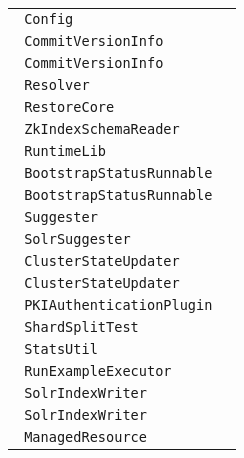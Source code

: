 \begin{center}
\begin{tabular}{ll}
\lstinline/ Config/&\raisebox{0pt}{\lstinline/   parseLuceneVersionString(StringmatchVersion)/}\\ 
\lstinline/ CommitVersionInfo/&\raisebox{0pt}{\lstinline/   fobuild(IndexCommit)/}\\ 
\lstinline/ CommitVersionInfo/&\raisebox{0pt}{\lstinline/   fobuild(IndexCommit)/}\\ 
\lstinline/ Resolver/&\raisebox{0pt}{\lstinline/   resolve(Objecto,JavaBinCodeccodec)/}\\ 
\lstinline/ RestoreCore/&\raisebox{0pt}{\lstinline/   booleandoRestore()/}\\ 
\lstinline/ ZkIndexSchemaReader/&\raisebox{0pt}{\lstinline/   command()/}\\ 
\lstinline/ RuntimeLib/&\raisebox{0pt}{\lstinline/   verify()/}\\ 
\lstinline/ BootstrapStatusRunnable/&\raisebox{0pt}{\lstinline/   sendBootstrapCommand()/}\\ 
\lstinline/ BootstrapStatusRunnable/&\raisebox{0pt}{\lstinline/   sendBootstrapCommand()/}\\ 
\lstinline/ Suggester/&\raisebox{0pt}{\lstinline/   getSuggestions(SpellingOptionsoptions)/}\\ 
\lstinline/ SolrSuggester/&\raisebox{0pt}{\lstinline/   getSuggestions(SuggesterOptionsoptions)/}\\ 
\lstinline/ ClusterStateUpdater/&\raisebox{0pt}{\lstinline/  amILeader()/}\\ 
\lstinline/ ClusterStateUpdater/&\raisebox{0pt}{\lstinline/   amILeader()/}\\ 
\lstinline/ PKIAuthenticationPlugin/&\raisebox{0pt}{\lstinline/   getRemotePublicKey(String)/}\\ 
\lstinline/ ShardSplitTest/&\raisebox{0pt}{\lstinline/   logDebugHelp(int[]))/}\\ 
\lstinline/ StatsUtil/&\raisebox{0pt}{\lstinline/   termFromString(Stringdata)/}\\ 
\lstinline/ RunExampleExecutor/&\raisebox{0pt}{\lstinline/   close()/}\\ 
\lstinline/ SolrIndexWriter/&\raisebox{0pt}{\lstinline/   rollback()/}\\ 
\lstinline/ SolrIndexWriter/&\raisebox{0pt}{\lstinline/   rollback()/}\\ 
\lstinline/ ManagedResource/&\raisebox{0pt}{\lstinline/   doPut()/}\\ 


\bottomrule
\end{tabular}
\end{center}


